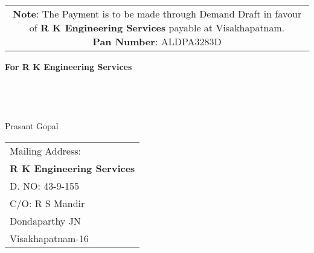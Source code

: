 \documentclass[11pt]{article}
\begin{document}
\vspace*{-1 cm}
\begin{tabular}{c}
\parbox{4in}{ {\bf Note}: The Payment is to be made through Demand Draft in favour of {\bf R K Engineering Services} payable at Visakhapatnam. \\
{\noindent \bf Pan Number}:  ALDPA3283D }\\
\end{tabular}
\vspace*{65pt}


{\bf For  R K Engineering Services } \\ \\ \\ \\ \\
 \hspace*{0.6cm}Prasant Gopal
\vspace*{-71pt}
\begin{flushright}
\begin{tabular}{l}
Mailing Address:\\
{\bf R K Engineering Services}\\
D. NO: 43-9-155\\
C/O: R  S Mandir\\
Dondaparthy JN\\ 
Visakhapatnam-16\\
\end{tabular}
\end{flushright}
\end{document}
